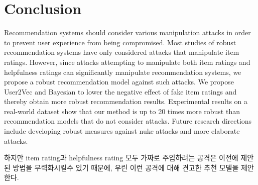 \documentclass[master,english,final]{kaist-ucs}
\begin{document}
\chapter{Conclusion}
Recommendation systems should consider various manipulation attacks in order to prevent user experience from being compromised.
Most studies of robust recommendation systems have only considered attacks that manipulate item ratings.
However, since attacks attempting to manipulate both item ratings and helpfulness ratings can significantly manipulate recommendation systems, we propose a robust recommendation model against such attacks.
We propose User2Vec and Bayesian to lower the negative effect of fake item ratings and thereby obtain more robust recommendation results.
Experimental results on a real-world dataset show that our method is up to 20 times more robust than recommendation models that do not consider attacks.
Future research directions include developing robust measures against nuke attacks and more elaborate attacks.



하지만 item rating과 helpfulness rating 모두 가짜로 주입하려는 공격은 이전에 제안된 방법을 무력화시킬수 있기 때문에, 우린 이런 공격에 대해 견고한 추천 모델을 제안한다.




\end{document}
